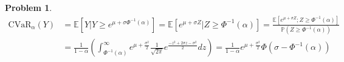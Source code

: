 \documentclass[a4paper, 8pt]{article}
\theoremstyle{definition}
\newtheorem{problem}{Problem}
\theoremstyle{hSol}
\begin{document}
\begin{problem}
\begin{equation}
	\begin{split}
		\text{CVaR}_{\alpha}(Y) &= \mathbb{E}\left[Y | Y\geq e^{\mu + \sigma \Phi^{-1}(\alpha)} \right] =\mathbb{E}\left[e^{\mu+\sigma Z} | Z \geq\Phi^{-1}(\alpha) \right] = \frac{\mathbb{E}\left[e^{\mu+\sigma Z} ; Z \geq\Phi^{-1}(\alpha) \right]}{\mathbb{P}\left(Z \geq\Phi^{-1}(\alpha)\right)}\\
		&= \frac{1}{1- \alpha }\left(\int_{\Phi^{-1}(\alpha)}^{\infty} e^{\mu + \frac{\sigma^2}{2}}\frac{1}{\sqrt{2\pi}} e^{\frac{-z^2+2\sigma z - \sigma^2}{2}}dz\right)= \frac{1}{1- \alpha}e^{\mu+\frac{\sigma^2}{2}}\Phi(\sigma-\Phi^{-1}(\alpha))
	\end{split}
\end{equation}
\end{problem}
\end{document}
